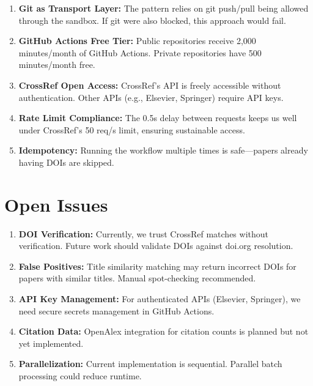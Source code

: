 \begin{enumerate}
    \item \textbf{Git as Transport Layer:} The pattern relies on git push/pull being allowed through the sandbox. If git were also blocked, this approach would fail.

    \item \textbf{GitHub Actions Free Tier:} Public repositories receive 2,000 minutes/month of GitHub Actions. Private repositories have 500 minutes/month free.

    \item \textbf{CrossRef Open Access:} CrossRef's API is freely accessible without authentication. Other APIs (e.g., Elsevier, Springer) require API keys.

    \item \textbf{Rate Limit Compliance:} The 0.5s delay between requests keeps us well under CrossRef's 50 req/s limit, ensuring sustainable access.

    \item \textbf{Idempotency:} Running the workflow multiple times is safe---papers already having DOIs are skipped.
\end{enumerate}

\section{Open Issues}
\label{sec:api-open-issues}

\begin{enumerate}
    \item \textbf{DOI Verification:} Currently, we trust CrossRef matches without verification. Future work should validate DOIs against doi.org resolution.

    \item \textbf{False Positives:} Title similarity matching may return incorrect DOIs for papers with similar titles. Manual spot-checking recommended.

    \item \textbf{API Key Management:} For authenticated APIs (Elsevier, Springer), we need secure secrets management in GitHub Actions.

    \item \textbf{Citation Data:} OpenAlex integration for citation counts is planned but not yet implemented.

    \item \textbf{Parallelization:} Current implementation is sequential. Parallel batch processing could reduce runtime.
\end{enumerate}

